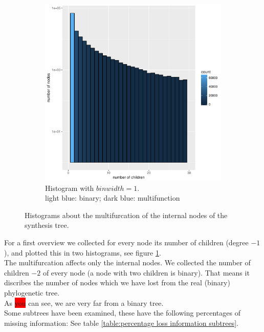 \begin{figure}[h]
\begin{subfigure}[b]{0.42\textwidth}
          \includegraphics[trim = 0mm 0mm 30mm 0mm, clip, width=\textwidth]{Figures/multifurc_small.pdf}
          \caption{Histogram with $binwidth = 1$. \\ light blue: binary; dark blue: multifunction}
        \end{subfigure}
        \caption{Histograms about the multifurcation of the internal nodes of the synthesis tree.}
        \label{fig:childrenOfNodes}
      \end{figure}

      For a first overview we collected for every node its number of children (degree $-1$), and plotted
        this in two histograms, see figure \ref{fig:childrenOfNodes}. \\
      The multifurcation affects only the internal nodes. We collected the number of children $-2$ of 
        every node (a node with two children is binary). That means it discribes the number of nodes which we have lost from the real (binary) 
      phylogenetic tree. \\
      As \colorbox{red}{you} can see, we are very far from a binary tree. \\

      Some subtrees have been examined, these have the following percentages of missing information: See 
        table \ref{table:percentage loss information subtrees}.

